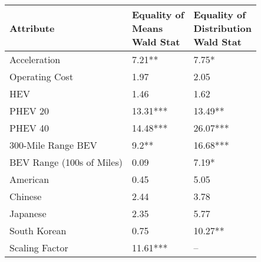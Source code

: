 \begin{tabular}{lll}
\toprule
                Attribute & \makecell{Equality of \\ Means \\ Wald Stat} & \makecell{Equality of \\ Distribution \\ Wald Stat} \\
\midrule
             Acceleration &                      \multirow{1}{*}{7.21**} &                             \multirow{1}{*}{7.75*} \\
           Operating Cost &                        \multirow{1}{*}{1.97} &                              \multirow{1}{*}{2.05} \\
                      HEV &                        \multirow{1}{*}{1.46} &                              \multirow{1}{*}{1.62} \\
                  PHEV 20 &                    \multirow{1}{*}{13.31***} &                           \multirow{1}{*}{13.49**} \\
                  PHEV 40 &                    \multirow{1}{*}{14.48***} &                          \multirow{1}{*}{26.07***} \\
       300-Mile Range BEV &                       \multirow{1}{*}{9.2**} &                          \multirow{1}{*}{16.68***} \\
BEV Range (100s of Miles) &                        \multirow{1}{*}{0.09} &                             \multirow{1}{*}{7.19*} \\
                 American &                        \multirow{1}{*}{0.45} &                              \multirow{1}{*}{5.05} \\
                  Chinese &                        \multirow{1}{*}{2.44} &                              \multirow{1}{*}{3.78} \\
                 Japanese &                        \multirow{1}{*}{2.35} &                              \multirow{1}{*}{5.77} \\
             South Korean &                        \multirow{1}{*}{0.75} &                           \multirow{1}{*}{10.27**} \\
           Scaling Factor &                    \multirow{1}{*}{11.61***} &                                                 -- \\
\bottomrule
\end{tabular}
